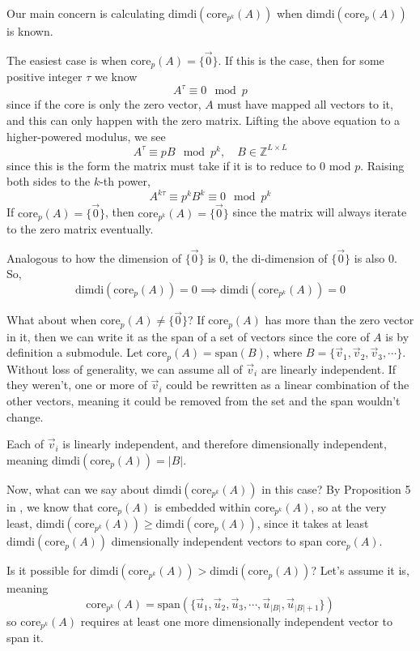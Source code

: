 \documentclass[a4paper, reqno, 12pt]{amsart}
\newcommand\dimdi[1]{\text{dimdi}(#1)}
\newcommand\core[2]{\text{core}_{#1}(#2)}
\newcommand\vecspan[1]{\text{span}(#1)}
\begin{document}
	Our main concern is calculating $\dimdi{\core{p^k}{A}}$ when $\dimdi{\core{p}{A}}$ is known.
	
	The easiest case is when $\core{p}{A} = \{\vec{0}\}$. If this is the case, then for some positive integer $\tau$ we know
	\[
		A^{\tau} \equiv 0 \mod{p}
	\]
	since if the core is only the zero vector, $A$ must have mapped all vectors to it, and this can only happen with the zero matrix. Lifting the above equation
	to a higher-powered modulus, we see
	\[
		A^{\tau} \equiv pB \mod{p^k}, \quad B \in \mathds{Z}^{L \times L}
	\]
	since this is the form the matrix must take if it is to reduce to 0 mod $p$. Raising both sides to the $k$-th power,
	\[
		A^{k\tau} \equiv p^{k}B^{k} \equiv 0 \mod{p^k}
	\]
	If $\core{p}{A} = \{\vec{0}\}$, then $\core{p^k}{A} = \{\vec{0}\}$ since the matrix will always iterate to the zero matrix eventually.
	
	Analogous to how the dimension of $\{\vec{0}\}$ is 0, the di-dimension of $\{\vec{0}\}$ is also 0. So,
	\[
		\dimdi{\core{p}{A}} = 0 \implies \dimdi{\core{p^k}{A}} = 0
	\]
	
	What about when $\core{p}{A} \neq \{\vec{0}\}$? If $\core{p}{A}$ has more than the zero vector in it, then we can write it as the span of a set of vectors since
	the core of $A$ is by definition a submodule. Let $\core{p}{A} = \vecspan{B}$, where $B = \{\vec{v}_{1}, \vec{v}_{2}, \vec{v}_{3}, \cdots\}$. Without loss of 
	generality, we can assume all of $\vec{v}_{i}$ are linearly independent. If they weren't, one or more of $\vec{v}_{i}$ could be rewritten as a linear 
	combination of the other vectors, meaning it could be removed from the set and the span wouldn't change.
	
	Each of $\vec{v}_{i}$ is linearly independent, and therefore dimensionally independent, meaning $\dimdi{\core{p}{A}} = |B|$.
	
	Now, what can we say about $\dimdi{\core{p^k}{A}}$ in this case? By Proposition 5 in \citet{Mendivil2012}, we know that $\core{p}{A}$ is embedded within 
	$\core{p^k}{A}$, so at the very least, $\dimdi{\core{p^k}{A}} \geq \dimdi{\core{p}{A}}$, since it takes at least $\dimdi{\core{p}{A}}$ dimensionally independent
	vectors to span $\core{p}{A}$.
	
	Is it possible for $\dimdi{\core{p^k}{A}} > \dimdi{\core{p}{A}}$? Let's assume it is, meaning
	\[
		\core{p^k}{A} = \vecspan{\{\vec{u}_{1}, \vec{u}_{2}, \vec{u}_{3}, \cdots, \vec{u}_{|B|}, \vec{u}_{|B|+1}\}}
	\]
	so $\core{p^k}{A}$ requires at least one more dimensionally independent vector to span it.
	
\end{document}
